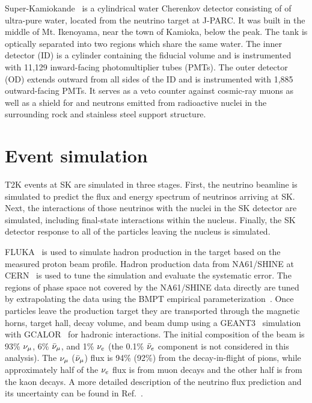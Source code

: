 \documentclass[
aps,
prd,
twocolumn,
superscriptaddress,
showpacs
]{revtex4-1}
\begin{document}
Super-Kamiokande~\cite{Fukuda:2002uc} is a cylindrical water Cherenkov detector consisting of  of ultra-pure water, located  from the neutrino target at J-PARC. It was built in the middle of Mt. Ikenoyama, near the town of Kamioka,  below the peak. The tank is optically separated into two regions which share the same water. The inner detector (ID) is a cylinder containing the  fiducial volume and is instrumented with 11,129 inward-facing photomultiplier tubes (PMTs). The outer detector (OD) extends  outward from all sides of the ID and is instrumented with 1,885 outward-facing PMTs. It  serves as a veto counter against cosmic-ray muons as well as a shield for \gmrs and neutrons emitted from radioactive nuclei in the surrounding rock and stainless steel support structure. 


\section{Event simulation}

T2K events at SK are simulated in three stages. First, the neutrino beamline is simulated to predict the flux and energy spectrum of neutrinos arriving at SK. Next, the interactions of those neutrinos with the nuclei in the SK detector are simulated, including final-state interactions within the nucleus. Finally, the SK detector response to all of the particles leaving the nucleus is simulated.

FLUKA~\cite{Battistoni:2011zz} is used to simulate hadron production in the target based on the measured proton beam profile. Hadron production data from NA61/SHINE at CERN~\cite{Abgrall:2011ae,Abgrall:2011ts} is used to tune the simulation and evaluate the systematic error.  The regions of phase space not covered by the NA61/SHINE data directly are tuned by extrapolating the data using the BMPT empirical parameterization~\cite{Bonesini:2001iz}.  Once particles leave the production target they are transported through the magnetic horns, target hall, decay volume, and beam dump using a GEANT3~\cite{Brun:1994aa} simulation with GCALOR~\cite{Zeitnitz:1994bs} for hadronic interactions. The initial composition of the beam is 93\% $\nu_\mu$, 6\% $\bar{\nu}_\mu$, and 1\% $\nu_e$ (the 0.1\% $\bar{\nu}_e$ component is not considered in this analysis). The $\nu_\mu$ ($\bar{\nu}_\mu$) flux is 94\% (92\%) from the decay-in-flight of pions, while approximately half of the $\nu_e$ flux is from muon decays and the other half is from the kaon decays.  A more detailed description of the neutrino flux prediction and its uncertainty can be found in Ref.~\cite{Abe:2012av}. 
\end{document}
